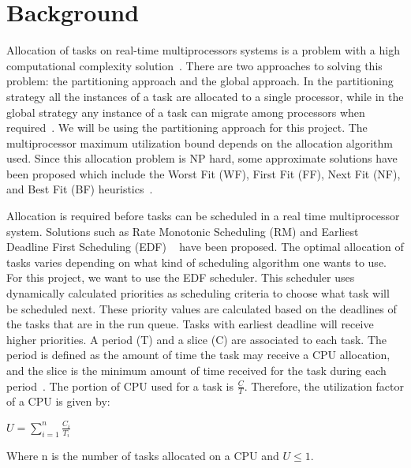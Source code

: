 \documentclass[11pt]{article}
\begin{document}
\maketitle
\doublespacing

\section{Background}

Allocation of tasks on real-time multiprocessors systems is a problem with a high computational complexity solution~\cite{Mondragon:13}. There are two approaches to solving this problem: the partitioning approach and the global approach. In the partitioning strategy all the instances of a task are allocated to a single processor, while in the global strategy any instance of a task can migrate among processors when required~\cite{Lopez:04}. We will be using the partitioning approach for this project. The multiprocessor maximum utilization bound depends on the allocation algorithm used. Since this allocation problem is NP hard, some approximate solutions have been proposed which include the Worst Fit (WF), First Fit (FF), Next Fit (NF), and Best Fit (BF) heuristics~\cite{Zapata:05}. 

Allocation is required before tasks can be scheduled in a real time multiprocessor system. Solutions such as Rate Monotonic Scheduling (RM) and Earliest Deadline First Scheduling (EDF) ~\cite{Dall:78} have been proposed. The optimal allocation of tasks varies depending on what kind of scheduling algorithm one wants to use. For this project, we want to use the EDF scheduler. This scheduler uses dynamically calculated priorities as scheduling criteria to choose what task will be scheduled next. These priority values are calculated based on the deadlines of the tasks that are in the run queue. Tasks with earliest deadline will receive higher priorities. A period (T) and a slice (C) are associated to each task. The period is defined as the amount of time the task may receive a CPU allocation, and the slice is the minimum amount of time received for the task during each period~\cite{Chung:73}. The portion of CPU used for a task is $\frac{C}{T}$. Therefore, the utilization factor of a CPU is given by: 

\begin{center}
$U = \sum_{i=1}^{n} \frac{C_{i}}{T_{i}}$ 
\end{center}

Where n is the number of tasks allocated on a CPU and $U \leq 1$. 
\end{document}
